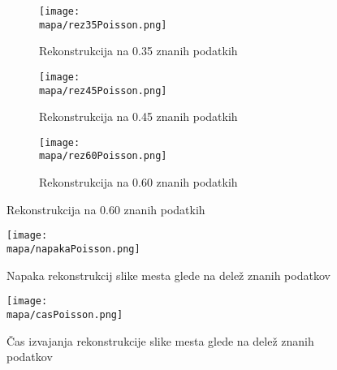 \renewcommand{\mapa}{Poglavja/Slike/kompleksnost/kompleksna grayscale 300}

\begin{figure}[h]
    \begin{subfigure}{0.32\linewidth}
        \texttt{[image: \\mapa/rez35Poisson.png]}
        \caption{Rekonstrukcija na 0.35 znanih podatkih}
    \end{subfigure}
    \hfill
    \begin{subfigure}{0.32\linewidth}
        \texttt{[image: \\mapa/rez45Poisson.png]}
        \caption{Rekonstrukcija na 0.45 znanih podatkih}
    \end{subfigure}
    \hfill
    \begin{subfigure}{0.32\linewidth}
        \texttt{[image: \\mapa/rez60Poisson.png]}
        \caption{Rekonstrukcija na 0.60 znanih podatkih}
    \end{subfigure}
\end{figure}

\begin{figure}[h]
    \texttt{[image: \\mapa/napakaPoisson.png]}
    \caption{Napaka rekonstrukcij slike mesta glede na delež znanih podatkov}
\end{figure}

\begin{figure}[h]
    \texttt{[image: \\mapa/casPoisson.png]}
    \caption{Čas izvajanja rekonstrukcije slike mesta glede na delež znanih podatkov}
\end{figure}
